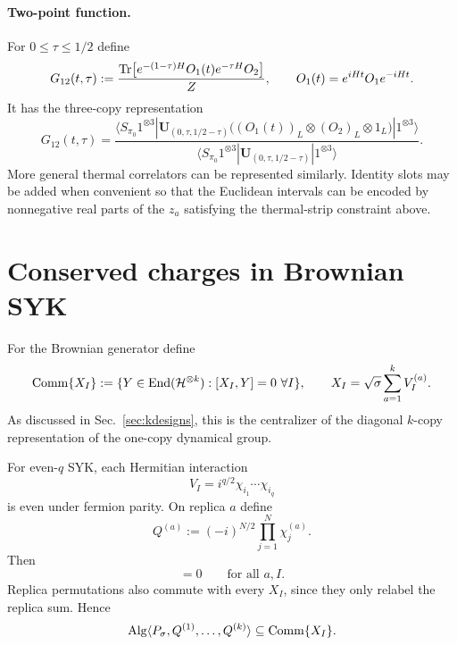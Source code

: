 \documentclass{article}
\theoremstyle{definition}
\begin{document}
\paragraph{Two-point function.}
For $0\le\tau\le1/2$ define
\begin{equation}
    G_{12}(t,\tau)
    :=\frac{
      {\rm Tr}\!\left[
        e^{-(1-\tau)H}O_1(t)e^{-\tau H}O_2
      \right]
    }{Z},
    \qquad
    O_1(t)=e^{iHt}O_1e^{-iHt}.
\end{equation}
It has the three-copy representation
\begin{equation}
    G_{12}(t,\tau)
    =\frac{
      \langle S_{\pi_0}1^{\otimes3}|
      \mathbf U_{(0,\tau,1/2-\tau)}
      \bigl((O_1(t))_L\otimes(O_2)_L\otimes1_L\bigr)
      |1^{\otimes3}\rangle
    }{
      \langle S_{\pi_0}1^{\otimes3}|
      \mathbf U_{(0,\tau,1/2-\tau)}
      |1^{\otimes3}\rangle
    }.
\end{equation}
More general thermal correlators can be represented similarly.  Identity
slots may be added when convenient so that the Euclidean intervals can be
encoded by nonnegative real parts of the $z_a$ satisfying the thermal-strip
constraint above.


\section{Conserved charges in Brownian SYK}

For the Brownian generator define
\begin{equation}
    {\rm Comm}\{X_I\}
    :=\{Y\in{\rm End}({\cal H}^{\otimes k}):[X_I,Y]=0\ \forall I\},
    \qquad
    X_I=\sqrt\sigma\sum_{a=1}^kV_I^{(a)}.
\end{equation}
As discussed in Sec.~\ref{sec:kdesigns}, this is the centralizer of the diagonal $k$-copy
representation of the one-copy dynamical group.

For even-$q$ SYK, each Hermitian interaction
\begin{equation}
    V_I=i^{q/2}\chi_{i_1}\cdots\chi_{i_q}
\end{equation}
is even under fermion parity.  On replica $a$ define
\begin{equation}
    Q^{(a)}
    :=(-i)^{N/2}\prod_{j=1}^N\chi_j^{(a)}.
\end{equation}
Then
\begin{equation}
    [Q^{(a)},X_I]=0
    \qquad\text{for all }a,I.
\end{equation}
Replica permutations also commute with every $X_I$, since they only relabel
the replica sum.  Hence
\begin{equation}
    {\rm Alg}\langle
       P_\sigma,Q^{(1)},\ldots,Q^{(k)}
    \rangle
    \subseteq {\rm Comm}\{X_I\}.
\end{equation}
\end{document}
